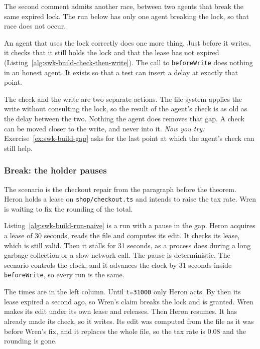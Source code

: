
The second comment admits another race, between two agents that break the
same expired lock. The run below has only one agent breaking the lock, so
that race does not occur.

An agent that uses the lock correctly does one more thing. Just before it
writes, it checks that it still holds the lock and that the lease has not
expired (Listing~\ref{alg:swk-build-check-then-write}). The call to
\texttt{beforeWrite} does nothing in an honest agent. It exists so that a test
can insert a delay at exactly that point.


The check and the write are two separate actions. The file system applies the
write without consulting the lock, so the result of the agent's check is as
old as the delay between the two. Nothing the agent does removes that gap. A
check can be moved closer to the write, and never into it. \emph{Now you try:}
Exercise~\ref{ex:swk-build-gap} asks for the last point at which the agent's
check can still help.

\subsubsection{Break: the holder pauses}

The scenario is the checkout repair from the paragraph before the theorem.
Heron holds a lease on \texttt{shop/checkout.ts} and intends to raise the tax
rate. Wren is waiting to fix the rounding of the total.

Listing~\ref{alg:swk-build-run-naive} is a run with a pause in the gap. Heron
acquires a lease of 30 seconds, reads the file and computes its edit. It
checks its lease, which is still valid. Then it stalls for 31 seconds, as a
process does during a long garbage collection or a slow network call. The
pause is deterministic. The scenario controls the clock, and it advances the
clock by 31 seconds inside \texttt{beforeWrite}, so every run is the same.


The times are in the left column. Until \texttt{t=31000} only Heron acts.
By then its lease expired a second ago, so Wren's claim breaks the lock and
is granted. Wren makes its edit under its own lease and releases. Then Heron
resumes. It has already made its check, so it writes. Its edit was computed
from the file as it was before Wren's fix, and it replaces the whole file, so
the tax rate is 0.08 and the rounding is gone.


